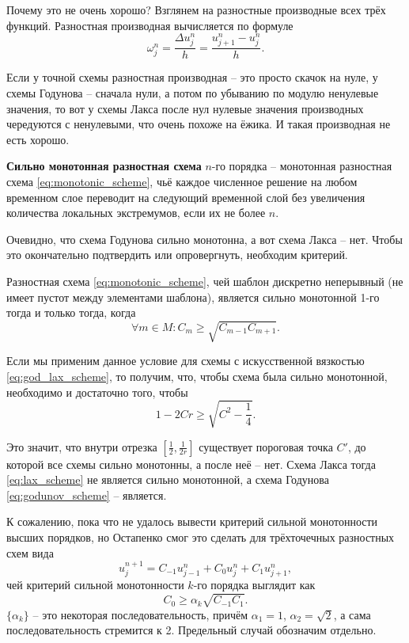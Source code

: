 \documentclass{article}
\begin{document}
Почему это не очень хорошо? Взглянем на разностные производные всех трёх
функций. Разностная производная вычисляется по формуле
\[\omega_j^n=\frac{\Delta u_j^n}{h}=\frac{u_{j+1}^n-u_j^n}{h}.\]

Если у точной схемы разностная производная -- это просто скачок на нуле, у
схемы Годунова -- сначала нули, а потом по убыванию по модулю ненулевые
значения, то вот у схемы Лакса после нул нулевые значения производных
чередуются с ненулевыми, что очень похоже на ёжика. И такая производная не есть
хорошо.

\begin{define}\label{eq:strongly_monotonic_scheme}
	\textbf{Сильно монотонная разностная схема} $n$-го порядка -- монотонная
	разностная схема \eqref{eq:monotonic_scheme}, чьё каждое численное
	решение на любом временном слое переводит на следующий временной слой
	без увеличения количества локальных экстремумов, если их не более $n$.
\end{define}

Очевидно, что схема Годунова сильно монотонна, а вот схема Лакса -- нет. Чтобы
это окончательно подтвердить или опровергнуть, необходим критерий.

\begin{theorem}
	Разностная схема \eqref{eq:monotonic_scheme}, чей шаблон дискретно
	неперывный (не имеет пустот между элементами шаблона), является
	сильно монотонной 1-го тогда и только тогда, когда
	\[\forall m\in M: C_m\ge\sqrt{C_{m-1}C_{m+1}}.\]
\end{theorem}

\noproof

Если мы применим данное условие для схемы с искусственной вязкостью
\eqref{eq:god_lax_scheme}, то получим, что, чтобы схема была сильно монотонной,
необходимо и достаточно того, чтобы
\[1-2Cr\ge\sqrt{C^2-\frac{1}{4}}.\]

Это значит, что внутри отрезка $[\frac{1}{2},\frac{1}{2r}]$ существует пороговая
точка $C'$, до которой все схемы сильно монотонны, а после неё -- нет. Схема
Лакса тогда \eqref{eq:lax_scheme} не является сильно монотонной, а схема
Годунова \eqref{eq:godunov_scheme} -- является.

К сожалению, пока что не удалось вывести критерий сильной монотонности высших
порядков, но Остапенко смог это сделать для трёхточечных разностных схем вида
\[u_j^{n+1}=C_{-1}u_{j-1}^n+C_0u_j^n+C_1u_{j+1}^n,\]
чей критерий сильной монотонности $k$-го порядка выглядит как
\[C_0\ge\alpha_k\sqrt{C_{-1}C_1}.\]
$\{\alpha_k\}$ -- это некоторая последовательность,
причём $\alpha_1=1$, $\alpha_2=\sqrt 2$, а сама последовательность стремится к
2. Предельный случай обозначим отдельно.
\end{document}
